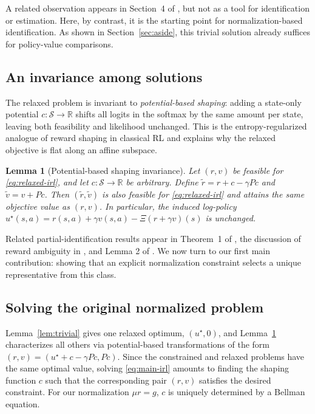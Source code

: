 \documentclass{article}
\newtheorem{lemma}{Lemma}
\newcommand{\1}{\mathbbm{1}}
\begin{document}
A related observation appears in Section~4 of \citet{fu2018airl}, but not as a
tool for identification or estimation. Here, by contrast, it is the starting
point for normalization-based identification. As shown in
Section~\ref{sec:aside}, this trivial solution already suffices for policy-value
comparisons.

 


\subsection{An invariance among solutions}
\label{sec:invariance}
The relaxed problem is invariant to \emph{potential-based shaping}: adding a state-only potential $c:\mathcal{S} \to \mathbb{R}$ shifts all logits in the softmax by the same amount per state, leaving both feasibility and likelihood unchanged. This is the entropy-regularized analogue of reward shaping in classical RL \citep{ng1999policy} and explains why the relaxed objective is flat along an affine subspace.  

\begin{lemma}[Potential-based shaping invariance]
\label{lem:shaping}
Let \((r,v)\) be feasible for \eqref{eq:relaxed-irl}, and let
\(c:\mathcal S\to\mathbb R\) be arbitrary. Define
\(\tilde r = r + c - \gamma Pc\) and \(\tilde v = v + Pc\).
Then \((\tilde r,\tilde v)\) is also feasible for \eqref{eq:relaxed-irl} and
attains the same objective value as \((r,v)\). In particular, the induced
log-policy
\(u^\star(s,a)=r(s,a)+\gamma v(s,a)-\Xi(r+\gamma v)(s)\) is unchanged.
\end{lemma}
 

 
Related partial-identification results appear in Theorem~1 of \citet{cao2021identifiability},
the discussion of reward ambiguity in \citet{fu2018airl}, and Lemma 2 of \citet{geng2020deep}.  We now turn to our first main contribution: showing that
an explicit normalization constraint selects a unique representative from this
class.
 
\subsection{Solving the original normalized problem}
\label{sec:solve-normalization}

Lemma~\ref{lem:trivial} gives one relaxed optimum, \((u^\star,0)\), and
Lemma~\ref{lem:shaping} characterizes all others via potential-based
transformations of the form \((r,v) = (u^\star + c - \gamma Pc, Pc)\). Since
the constrained and relaxed problems have the same optimal value, solving
\eqref{eq:main-irl} amounts to finding the shaping function \(c\) such that
the corresponding pair \((r,v)\) satisfies the desired constraint. For our
normalization \(\mu r = g\), \(c\) is uniquely determined by a Bellman
equation.
\end{document}
